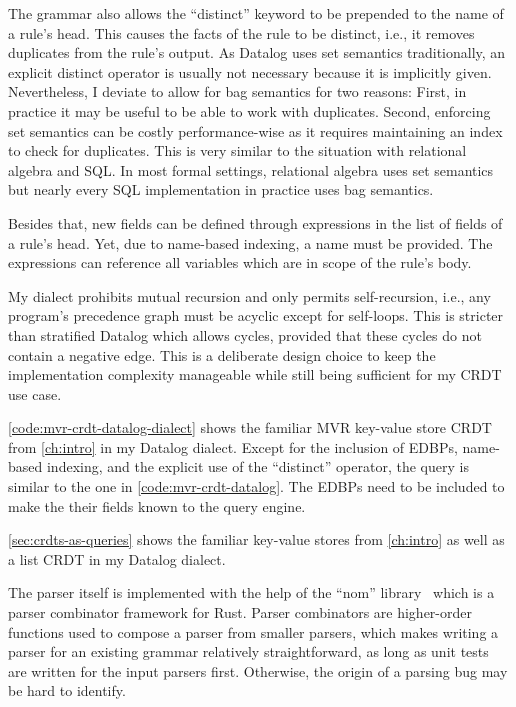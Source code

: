 The grammar also allows the ``distinct'' keyword to be prepended to the name
of a rule's head.
This causes the facts of the rule to be distinct, i.e., it removes duplicates
from the rule's output.
As Datalog uses set semantics traditionally, an explicit distinct operator
is usually not necessary because it is implicitly given.
Nevertheless, I deviate to allow for bag semantics for two reasons:
First, in practice it may be useful to be able to work with duplicates.
Second, enforcing set semantics can be costly performance-wise
as it requires maintaining an index to check for duplicates.
This is very similar to the situation with relational algebra and SQL.
In most formal settings, relational algebra uses set semantics but nearly
every SQL implementation in practice uses bag semantics.

Besides that, new fields can be defined through expressions in the list of fields
of a rule's head.
Yet, due to name-based indexing, a name must be provided.
The expressions can reference all variables which are in scope of the rule's body.

My dialect prohibits mutual recursion and only permits self-recursion, i.e.,
any program's precedence graph must be acyclic except for self-loops.
This is stricter than stratified Datalog which allows cycles,
provided that these cycles do not contain a negative edge.
This is a deliberate design choice to keep the implementation complexity manageable
while still being sufficient for my \ac{CRDT} use case.

\ref{code:mvr-crdt-datalog-dialect} shows the familiar \ac{MVR} key-value store
\ac{CRDT} from \ref{ch:intro} in my Datalog dialect.
Except for the inclusion of \acp{EDBP}, name-based indexing, and the explicit
use of the ``distinct'' operator, the query is similar to the one
in \ref{code:mvr-crdt-datalog}.
The \acp{EDBP} need to be included to make the their fields known to the
query engine.

\ref{sec:crdts-as-queries} shows the familiar key-value stores from \ref{ch:intro}
as well as a list \ac{CRDT} in my Datalog dialect.

The parser itself is implemented with the help of the ``nom'' library~\cite{nom}
which is a parser combinator framework for Rust.
Parser combinators are higher-order functions used to compose a parser
from smaller parsers, which makes writing a parser for an existing grammar
relatively straightforward, as long as unit tests are written for the input
parsers first. Otherwise, the origin of a parsing bug may be hard to identify.

